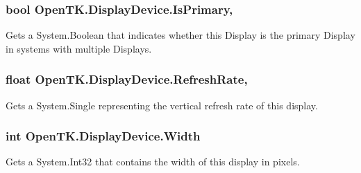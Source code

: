 \hypertarget{class_open_t_k_1_1_display_device_a45910e472c9487f77a80d2eaf699b0cf}{
\subsubsection[{Is\-Primary}]{\setlength{\rightskip}{0pt plus 5cm}bool Open\-T\-K.\-Display\-Device.\-Is\-Primary\hspace{0.3cm}{\ttfamily [get]}, {\ttfamily [set]}}}\label{class_open_t_k_1_1_display_device_a45910e472c9487f77a80d2eaf699b0cf}


Gets a System.\-Boolean that indicates whether this Display is the primary Display in systems with multiple Displays.

\hypertarget{class_open_t_k_1_1_display_device_aeafbdb3c00fd95587654742b62ff7145}{
\subsubsection[{Refresh\-Rate}]{\setlength{\rightskip}{0pt plus 5cm}float Open\-T\-K.\-Display\-Device.\-Refresh\-Rate\hspace{0.3cm}{\ttfamily [get]}, {\ttfamily [set]}}}\label{class_open_t_k_1_1_display_device_aeafbdb3c00fd95587654742b62ff7145}


Gets a System.\-Single representing the vertical refresh rate of this display. 

\hypertarget{class_open_t_k_1_1_display_device_a43b8973ddea03c873aa0006785d7da4d}{
\subsubsection[{Width}]{\setlength{\rightskip}{0pt plus 5cm}int Open\-T\-K.\-Display\-Device.\-Width\hspace{0.3cm}{\ttfamily [get]}}}\label{class_open_t_k_1_1_display_device_a43b8973ddea03c873aa0006785d7da4d}


Gets a System.\-Int32 that contains the width of this display in pixels.

